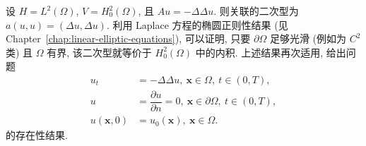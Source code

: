 \begin{Example}
\label{ex:biharmonic-parabolic-clamped-problem}
设 $H=L^2(\Omega)$, $V=H_0^2(\Omega)$, 且 $Au=-\Delta\Delta u$. 则关联的二次型为 $a(u,u)=(\Delta u,\Delta u)$. 利用 Laplace 方程的椭圆正则性结果 (见 Chapter~\ref{chap:linear-elliptic-equations}), 可以证明, 只要 $\partial\Omega$ 足够光滑 (例如为 $C^2$ 类) 且 $\Omega$ 有界, 该二次型就等价于 $H_0^2(\Omega)$ 中的内积. 上述结果再次适用, 给出问题
\begin{equation}\label{eq:biharmonic-parabolic-clamped-initial-boundary-problem}
\begin{aligned}u_t&=-\Delta\Delta u,\ \bm{x}\in\Omega,\ t\in(0,T),\\u&=\dfrac{\partial u}{\partial n}=0,\ \bm{x}\in\partial\Omega,\ t\in(0,T),\\u(\bm{x},0)&=u_0(\bm{x}),\ \bm{x}\in\Omega.\end{aligned}
\end{equation}
的存在性结果.
\end{Example}

